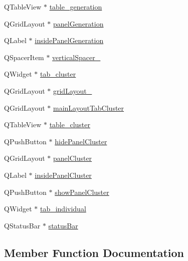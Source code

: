 \begin{DoxyCompactItemize}
\item 
Q\+Table\+View $\ast$ \hyperlink{class_ui___g_a___viz_a07650c4db01f2e92b4a8945a1cd314a2}{table\+\_\+generation}
\item 
Q\+Grid\+Layout $\ast$ \hyperlink{class_ui___g_a___viz_a1118e4066fb80d07e1d18c3ae0784510}{panel\+Generation}
\item 
Q\+Label $\ast$ \hyperlink{class_ui___g_a___viz_a4cb16b41c5de783dc45f682dcfbb19ca}{inside\+Panel\+Generation}
\item 
Q\+Spacer\+Item $\ast$ \hyperlink{class_ui___g_a___viz_a65805ffae6e524192de510c7dfe228c2}{vertical\+Spacer\+\_}
\item 
Q\+Widget $\ast$ \hyperlink{class_ui___g_a___viz_a1c94c4e7e48c8745f7256ff2ed527963}{tab\+\_\+cluster}
\item 
Q\+Grid\+Layout $\ast$ \hyperlink{class_ui___g_a___viz_a9f05c0fd6cdce104e619163aac9cc625}{grid\+Layout\+\_}
\item 
Q\+Grid\+Layout $\ast$ \hyperlink{class_ui___g_a___viz_a7ae94d300c15e5453b225fe684f423e5}{main\+Layout\+Tab\+Cluster}
\item 
Q\+Table\+View $\ast$ \hyperlink{class_ui___g_a___viz_aceeebeb4625c6230b09ece18fb740e3a}{table\+\_\+cluster}
\item 
Q\+Push\+Button $\ast$ \hyperlink{class_ui___g_a___viz_afce80db360229b362cf690d38ca20ef9}{hide\+Panel\+Cluster}
\item 
Q\+Grid\+Layout $\ast$ \hyperlink{class_ui___g_a___viz_a5a30d0686344a323fa962fda999b3eb0}{panel\+Cluster}
\item 
Q\+Label $\ast$ \hyperlink{class_ui___g_a___viz_abfb28a97dfc8983c76ef865655cb510c}{inside\+Panel\+Cluster}
\item 
Q\+Push\+Button $\ast$ \hyperlink{class_ui___g_a___viz_a9474a5753d12395525f49f87a43d9548}{show\+Panel\+Cluster}
\item 
Q\+Widget $\ast$ \hyperlink{class_ui___g_a___viz_a20216f576b740678c5608a8d3e6a48c7}{tab\+\_\+individual}
\item 
Q\+Status\+Bar $\ast$ \hyperlink{class_ui___g_a___viz_aaca4bdb45d2f3babc575d3b372ced87c}{status\+Bar}
\end{DoxyCompactItemize}


\subsection{Member Function Documentation}
\mbox{\label{class_ui___g_a___viz_a7b2fb4dab37d5c96f3e8ccd6f49498b9}} 
